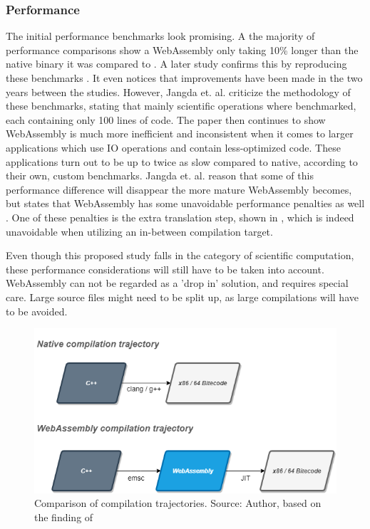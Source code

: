 \subsubsection*{Performance}

The initial performance benchmarks look promising. A the majority of performance comparisons show a WebAssembly only taking 10\% longer than the native binary it was compared to \cite{haas_bringing_2017}. A later study confirms this by reproducing these benchmarks \cite{jangda_not_2019}. It even notices that improvements have been made in the two years between the studies. However, Jangda et. al. criticize the methodology of these benchmarks, stating that mainly scientific operations where benchmarked, each containing only 100 lines of code. The paper then continues to show WebAssembly is much more inefficient and inconsistent when it comes to larger applications which use IO operations and contain less-optimized code. These applications turn out to be up to twice as slow compared to native, according to their own, custom benchmarks. Jangda et. al. reason that some of this performance difference will disappear the more mature WebAssembly becomes, but states that WebAssembly has some unavoidable performance penalties as well \cite{jangda_not_2019}. One of these penalties is the extra translation step, shown in , which is indeed unavoidable when utilizing an in-between compilation target. 

Even though this proposed study falls in the category of scientific computation, these performance considerations will still have to be taken into account. WebAssembly can not be regarded as a 'drop in' solution, and requires special care. Large source files might need to be split up, as large compilations will have to be avoided.  

\begin{figure}[!tbp]
  \centering
  \begin{minipage}[b]{0.80\textwidth}
    \includegraphics[width=\textwidth]{../schemas/wasm-performance/wasm-perf.png}
    \caption{Comparison of compilation trajectories. Source: Author, based on the finding of \cite{jangda_not_2019}}
    \label{fig:wasm-trajectory}
  \end{minipage}
\end{figure}

